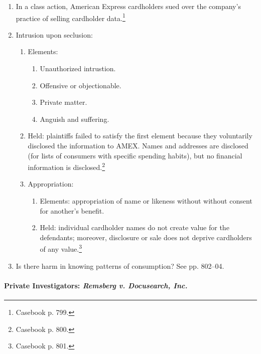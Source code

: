 \begin{enumerate}
    \item In a class action, American Express cardholders sued over the 
    company's practice of selling cardholder data.\footnote{Casebook p. 799.}
    \item Intrusion upon seclusion:
    \begin{enumerate}
        \item Elements:
        \begin{enumerate}
            \item Unauthorized intrustion.
            \item Offensive or objectionable.
            \item Private matter.
            \item Anguish and suffering.
        \end{enumerate}
        \item Held: plaintiffs failed to satisfy the first element because they 
        voluntarily disclosed the information to AMEX. Names and addresses are 
        disclosed (for lists of consumers with specific spending habits), but no 
        financial information is disclosed.\footnote{Casebook p. 800.}
        \item Appropriation:
        \begin{enumerate}
            \item Elements: appropriation of name or likeness without without 
            consent for another's benefit.
            \item Held: individual cardholder names do not create value for the 
            defendants; moreover, disclosure or sale does not deprive 
            cardholders of any value.\footnote{Casebook p. 801.}
        \end{enumerate}
    \end{enumerate}
    \item Is there harm in knowing patterns of consumption? See pp. 802--04.
\end{enumerate}

\paragraph{Private Investigators: \emph{Remsberg v. Docusearch, Inc.}}

